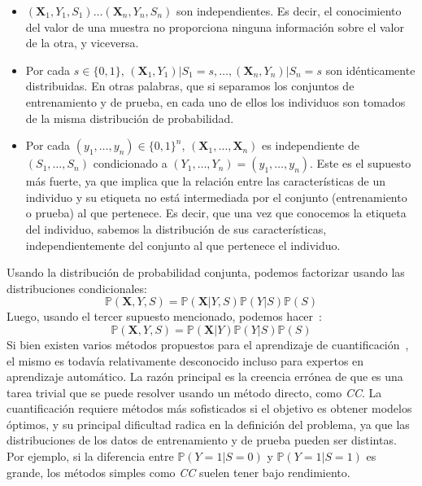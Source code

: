 \begin{itemize}
  \item $(\boldsymbol{X}_1,Y_1,S_1) \dots (\boldsymbol{X}_n,Y_n,S_n)$ son
  independientes. Es decir, el conocimiento del valor de una muestra no
  proporciona ninguna información sobre el valor de la otra, y viceversa.
  \item Por cada $s \in \{0,1\}$,
  $(\boldsymbol{X}_1,Y_1)|S_1=s,\dots,(\boldsymbol{X}_n,Y_n)|S_n=s$ son
  idénticamente distribuidas. En otras palabras, que si separamos los conjuntos
  de entrenamiento y de prueba, en cada uno de ellos los individuos son tomados
  de la misma distribución de probabilidad.
  \item Por cada $(y_1,\dots,y_n)\in{\{0,1\}}^n$,
  $(\boldsymbol{X}_1,\dots,\boldsymbol{X}_n)$ es independiente de
  $(S_1,\dots,S_n)$ condicionado a $(Y_1,\dots,Y_n)=(y_1,\dots,y_n)$. Este es el
  supuesto más fuerte, ya que implica que la relación entre las características
  de un individuo y su etiqueta no está intermediada por el conjunto
  (entrenamiento o prueba) al que pertenece. Es decir, que una vez que conocemos
  la etiqueta del individuo, sabemos la distribución de sus características,
  independientemente del conjunto al que pertenece el individuo.
\end{itemize}

Usando la distribución de probabilidad conjunta, podemos factorizar usando las
distribuciones condicionales:
\begin{equation}
    \mathbb{P}(\boldsymbol{X},Y,S)=\mathbb{P}(\boldsymbol{X}|Y,S)\mathbb{P}(Y|S)\mathbb{P}(S)
\end{equation}
Luego, usando el tercer supuesto mencionado, podemos
hacer~\cite{moreno2012unifying}:
\begin{equation}
    \mathbb{P}(\boldsymbol{X},Y,S)=\mathbb{P}(\boldsymbol{X}|Y)\mathbb{P}(Y|S)\mathbb{P}(S)
\end{equation}
Si bien existen varios métodos propuestos para el aprendizaje de
cuantificación~\cite{esuli2023learning, gonzalez2017review}, el mismo es todavía
relativamente desconocido incluso para expertos en aprendizaje automático. La
razón principal es la creencia errónea de que es una tarea trivial que se puede
resolver usando un método directo, como {\it CC}. La cuantificación requiere
métodos más sofisticados si el objetivo es obtener modelos óptimos, y su
principal dificultad radica en la definición del problema, ya que las
distribuciones de los datos de entrenamiento y de prueba pueden ser distintas.
Por ejemplo, si la diferencia entre $\mathbb{P}(Y=1|S=0)$ y
$\mathbb{P}(Y=1|S=1)$ es grande, los métodos simples como {\it CC\/} suelen
tener bajo rendimiento.


